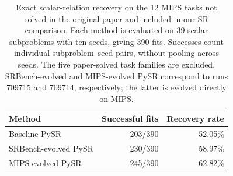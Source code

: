 \begin{table}[t]
\centering
\begingroup
{}
\begin{tabular}{lrr}
\hline
Method & Successful fits & Recovery rate \\
\hline
\textcolor{mipsBase}{Baseline PySR} & \textcolor{mipsBase}{203/390} & \textcolor{mipsBase}{52.05\%} \\
\textcolor{mipsSRBench}{SRBench-evolved PySR} & \textcolor{mipsSRBench}{230/390} & \textcolor{mipsSRBench}{58.97\%} \\
\textcolor{mipsEvolved}{MIPS-evolved PySR} & \textcolor{mipsEvolved}{245/390} & \textcolor{mipsEvolved}{62.82\%} \\
\hline
\end{tabular}
\endgroup
\caption{Exact scalar-relation recovery on the 12 MIPS tasks not solved in the original paper and included in our SR comparison. Each method is evaluated on 39 scalar subproblems with ten seeds, giving 390 fits. Successes count individual subproblem--seed pairs, without pooling across seeds. The five paper-solved task families are excluded. SRBench-evolved and MIPS-evolved PySR correspond to runs 709715 and 709714, respectively; the latter is evolved directly on MIPS.}
\label{tab:mips-scalar-recovery}
\end{table}

